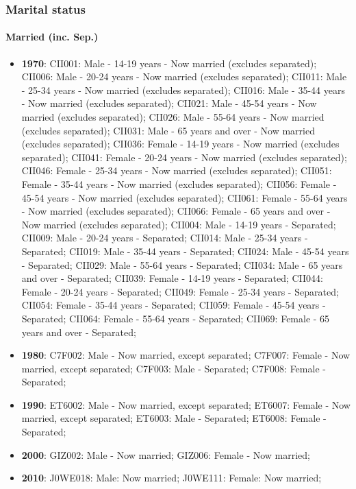 \documentclass[a4paper]{article}
\begin{document}
\subsubsection{Marital status}
\paragraph{Married (inc. Sep.)}
\begin{itemize}
   \item{\textbf{1970}:  CII001: Male - 14-19 years - Now married (excludes separated); CII006: Male - 20-24 years - Now married (excludes separated); CII011: Male - 25-34 years - Now married (excludes separated); CII016: Male - 35-44 years - Now married (excludes separated); CII021: Male - 45-54 years - Now married (excludes separated); CII026: Male - 55-64 years - Now married (excludes separated); CII031: Male - 65 years and over - Now married (excludes separated); CII036: Female - 14-19 years - Now married (excludes separated); CII041: Female - 20-24 years - Now married (excludes separated); CII046: Female - 25-34 years - Now married (excludes separated); CII051: Female - 35-44 years - Now married (excludes separated); CII056: Female - 45-54 years - Now married (excludes separated); CII061: Female - 55-64 years - Now married (excludes separated); CII066: Female - 65 years and over - Now married (excludes separated); CII004: Male - 14-19 years - Separated; CII009: Male - 20-24 years - Separated; CII014: Male - 25-34 years - Separated; CII019: Male - 35-44 years - Separated; CII024: Male - 45-54 years - Separated; CII029: Male - 55-64 years - Separated; CII034: Male - 65 years and over - Separated; CII039: Female - 14-19 years - Separated; CII044: Female - 20-24 years - Separated; CII049: Female - 25-34 years - Separated; CII054: Female - 35-44 years - Separated; CII059: Female - 45-54 years - Separated; CII064: Female - 55-64 years - Separated; CII069: Female - 65 years and over - Separated;}
   \item{\textbf{1980}:  C7F002: Male - Now married, except separated; C7F007: Female - Now married, except separated; C7F003: Male - Separated; C7F008: Female - Separated;}
   \item{\textbf{1990}:  ET6002: Male - Now married, except separated; ET6007: Female - Now married, except separated; ET6003: Male - Separated; ET6008: Female - Separated;}
   \item{\textbf{2000}:  GIZ002: Male - Now married; GIZ006: Female - Now married;}
   \item{\textbf{2010}:  J0WE018: Male: Now married; J0WE111: Female: Now married;}
\end{itemize}
\end{document}
